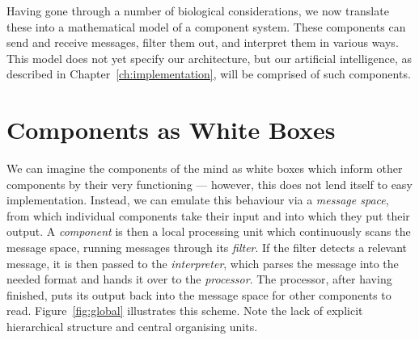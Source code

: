 Having gone through a number of biological considerations, we now translate these into a mathematical model of a component system. These components can send and receive messages, filter them out, and interpret them in various ways. This model does not yet specify our architecture, but our artificial intelligence, as described in Chapter~\ref{ch:implementation}, will be comprised of such components.

\section{Components as White Boxes}\label{sec:whiteBoxModel2}

We can imagine the components of the mind as white boxes which inform other components by their very functioning --- however, this does not lend itself to easy implementation. Instead, we can emulate this behaviour via a \emph{message space}, from which individual components take their input and into which they put their output. A \emph{component} is then a local processing unit which continuously scans the message space, running messages through its \emph{filter}. If the filter detects a relevant message, it is then passed to the \emph{interpreter}, which parses the message into the needed format and hands it over to the \emph{processor}. The processor, after having finished, puts its output back into the message space for other components to read. Figure~\ref{fig:global} illustrates this scheme. Note the lack of explicit hierarchical structure and central organising units.

